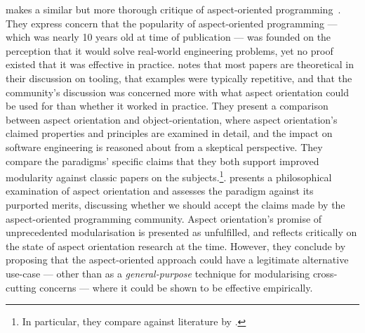 \citeauthor{steimann06paradoxical} makes a similar but more thorough critique of
aspect-oriented programming~\cite{steimann06paradoxical}. They express concern
that the popularity of aspect-oriented programming --- which was nearly 10 years
old at time of publication --- was founded on the perception that it would solve
real-world engineering problems, yet no proof existed that it was effective in
practice. \citeauthor{steimann06paradoxical} notes that most papers are
theoretical in their discussion on tooling, that examples were typically
repetitive, and that the community's discussion was concerned more with what
aspect orientation could be used for than whether it worked in practice. They
present a comparison between aspect orientation and object-orientation, where
aspect orientation's claimed properties and principles are examined in detail,
and the impact on software engineering is reasoned about from a skeptical
perspective. They compare the paradigms' specific claims that they both support
improved modularity against classic papers on the subjects.\footnote{In
  particular, they compare against literature by \citet{parnas_1972}.}.
\citeauthor{steimann06paradoxical} presents a philosophical examination of
aspect orientation and assesses the paradigm against its purported merits,
discussing whether we should accept the claims made by the aspect-oriented
programming community. Aspect orientation's promise of unprecedented
modularisation is presented as unfulfilled, and
\citeauthor{steimann06paradoxical} reflects critically on the state of
aspect orientation research at the time. However, they conclude by proposing
that the aspect-oriented approach could have a legitimate alternative use-case
--- other than as a \emph{general-purpose} technique for modularising
cross-cutting concerns --- where it could be shown to be effective empirically.

